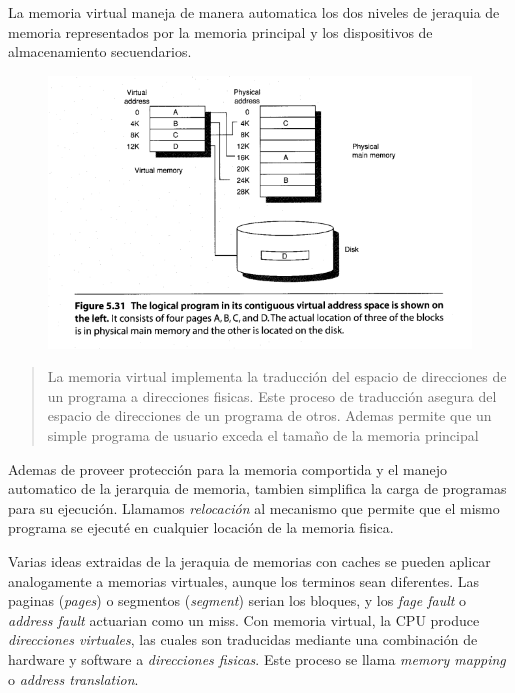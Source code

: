 \documentclass{article}
\begin{document}
La memoria virtual maneja de manera automatica los dos niveles de jeraquia de memoria representados por la memoria principal y los dispositivos de almacenamiento secuendarios.

\begin{figure}[h!]
    \includegraphics[width=\linewidth]{imagenes/VirtualAdress.png}
\end{figure}

\begin{quote}
    La memoria virtual implementa la traducción del espacio de direcciones de un programa a direcciones fisicas. Este proceso de traducción asegura del espacio de direcciones de un programa de otros.
    Ademas permite que un simple programa de usuario exceda el tamaño de la memoria principal
\end{quote}

Ademas de proveer protección para la memoria comportida y el manejo automatico de la jerarquia de memoria, tambien simplifica la carga de programas para su ejecución.
Llamamos \textit{relocación} al mecanismo que permite que el mismo programa se ejecuté en cualquier locación de la memoria fisica.

Varias ideas extraidas de la jeraquia de memorias con caches se pueden aplicar analogamente a memorias virtuales, aunque los terminos sean diferentes.
Las paginas (\textit{pages}) o segmentos (\textit{segment}) serian los bloques, y los \textit{fage fault} o \textit{address fault} actuarian como un miss. 
Con memoria virtual, la CPU produce \textit{direcciones virtuales}, las cuales son traducidas mediante una combinación de hardware y software a \textit{direcciones fisicas}. Este proceso se llama \textit{memory mapping} o \textit{address translation}.
\end{document}
